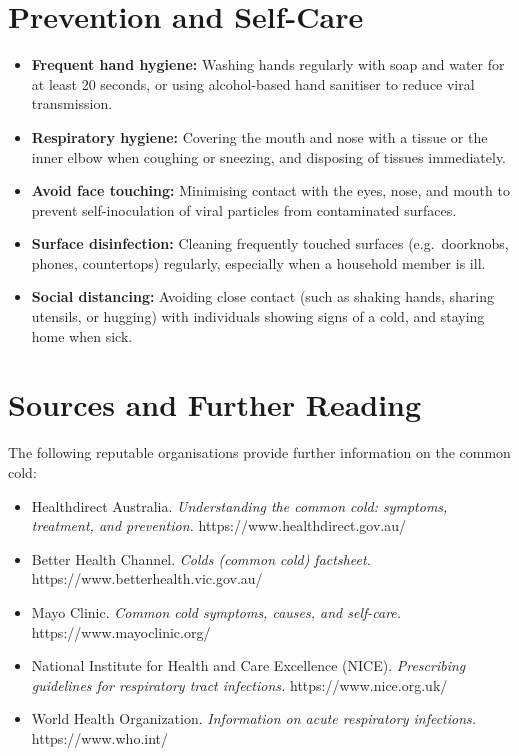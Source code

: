 \section*{Prevention and Self-Care}
\begin{itemize}
    \item \textbf{Frequent hand hygiene:} Washing hands regularly with soap and water for at least 20 seconds, or using alcohol-based hand sanitiser to reduce viral transmission.
    \item \textbf{Respiratory hygiene:} Covering the mouth and nose with a tissue or the inner elbow when coughing or sneezing, and disposing of tissues immediately.
    \item \textbf{Avoid face touching:} Minimising contact with the eyes, nose, and mouth to prevent self-inoculation of viral particles from contaminated surfaces.
    \item \textbf{Surface disinfection:} Cleaning frequently touched surfaces (e.g.\ doorknobs, phones, countertops) regularly, especially when a household member is ill.
    \item \textbf{Social distancing:} Avoiding close contact (such as shaking hands, sharing utensils, or hugging) with individuals showing signs of a cold, and staying home when sick.
\end{itemize}

\section*{Sources and Further Reading}
The following reputable organisations provide further information on the common cold:
\begin{itemize}
    \item Healthdirect Australia. \textit{Understanding the common cold: symptoms, treatment, and prevention.} https://www.healthdirect.gov.au/
    \item Better Health Channel. \textit{Colds (common cold) factsheet.} https://www.betterhealth.vic.gov.au/
    \item Mayo Clinic. \textit{Common cold symptoms, causes, and self-care.} https://www.mayoclinic.org/
    \item National Institute for Health and Care Excellence (NICE). \textit{Prescribing guidelines for respiratory tract infections.} https://www.nice.org.uk/
    \item World Health Organization. \textit{Information on acute respiratory infections.} https://www.who.int/
\end{itemize}
